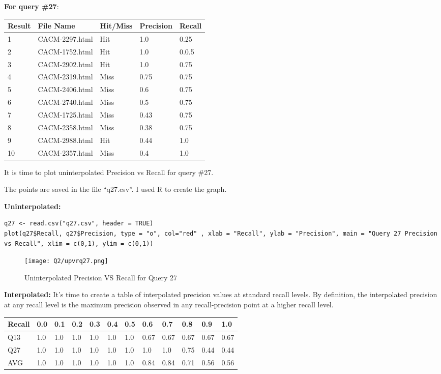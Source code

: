 \pagebreak

\textbf{For query \#27}:

\begin{longtable}{ |p{1cm}|p{4cm}|p{3cm}|p{2cm}|p{2cm}| } 
\hline
Result & File Name & Hit/Miss & Precision & Recall\\
\hline
1 & CACM-2297.html & Hit & 1.0 & 0.25 \\
\hline
2 & CACM-1752.html & Hit & 1.0 & 0.0.5 \\
\hline
3 & CACM-2902.html & Hit & 1.0 & 0.75 \\
\hline
4 & CACM-2319.html & Miss & 0.75 & 0.75 \\
\hline
5 & CACM-2406.html & Miss & 0.6 & 0.75 \\
\hline
6 & CACM-2740.html & Miss & 0.5 & 0.75 \\
\hline
7 & CACM-1725.html & Miss & 0.43 & 0.75 \\
\hline
8 & CACM-2358.html & Miss & 0.38 & 0.75 \\
\hline
9 & CACM-2988.html & Hit & 0.44 & 1.0 \\
\hline
10 & CACM-2357.html & Miss & 0.4 & 1.0 \\
\hline
\end{longtable}

It is time to plot uninterpolated Precision vs Recall for query \#27.

The points are saved in the file ``q27.csv''. I used R to create the graph.

\textbf{Uninterpolated:}

\begin{lstlisting}[breakatwhitespace=〈false)]
q27 <- read.csv("q27.csv", header = TRUE)
plot(q27$Recall, q27$Precision, type = "o", col="red" , xlab = "Recall", ylab = "Precision", main = "Query 27 Precision vs Recall", xlim = c(0,1), ylim = c(0,1))
\end{lstlisting}


\begin{figure}[h]
\caption{Uninterpolated Precision VS Recall for Query 27}
\centering
\texttt{[image: Q2/upvrq27.png]}
\end{figure}


\textbf{Interpolated:}
It's time to create a table of interpolated precision values at standard recall levels. By definition, the interpolated precision at any recall level is the maximum precision observed in any recall-precision point at a higher recall level.

\begin{longtable}{|p{1cm}|p{0.7cm}|p{0.7cm}|p{0.7cm}|p{0.7cm}|p{0.7cm}|p{0.7cm}|p{0.7cm}|p{0.7cm}|p{0.7cm}|p{0.7cm}|p{0.7cm}|} 
\hline
Recall & 0.0 & 0.1 & 0.2 & 0.3 & 0.4 & 0.5 & 0.6 & 0.7 & 0.8 & 0.9 & 1.0\\
\hline
Q13 & 1.0 & 1.0 & 1.0 & 1.0 & 1.0 & 1.0 & 0.67 & 0.67 & 0.67 & 0.67 & 0.67\\
\hline
Q27 & 1.0 & 1.0 & 1.0 & 1.0 & 1.0 & 1.0 & 1.0 & 1.0 & 0.75 & 0.44 & 0.44\\
\hline
AVG & 1.0 & 1.0 & 1.0 & 1.0 & 1.0 & 1.0 & 0.84 & 0.84 & 0.71 & 0.56 & 0.56\\
\hline
\end{longtable}

